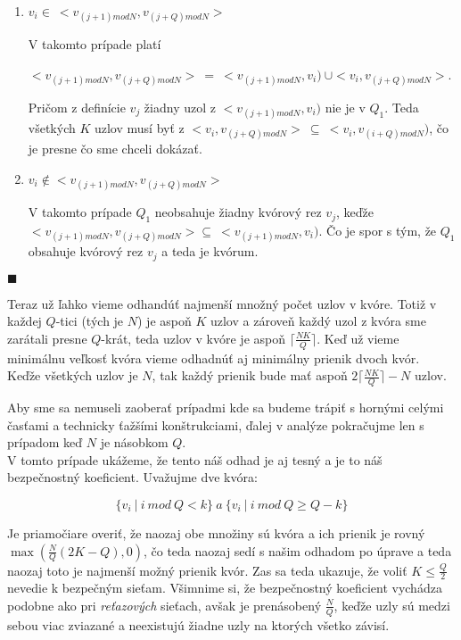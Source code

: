 \begin{enumerate}
  \item $v_i\in\: <v_{(j+1) mod N}, v_{(j+Q) mod N}>$

        V takomto prípade platí

        $<v_{(j+1) mod N}, v_{(j+Q) mod N}>\:=\: <v_{(j+1) mod N}, v_i)\: \cup <v_i, v_{(j+Q) mod N}>$.

        Pričom z definície $v_j$ žiadny uzol z $<v_{(j+1) mod N}, v_i)$ nie je v $Q_1$.
        Teda všetkých $K$ uzlov musí byť z $<v_i, v_{(j+Q) mod N}>\: \subseteq\: <v_i, v_{(i+Q) mod N})$,
        čo je presne čo sme chceli dokázať.
  \item $v_i\notin <v_{(j+1) mod N}, v_{(j+Q) mod N}>$

        V takomto prípade $Q_1$ neobsahuje žiadny kvórový rez $v_j$, keďže\\
        $<v_{(j+1) mod N}, v_{(j+Q) mod N}> \subseteq\: <v_{(j+1) mod N}, v_i)$.
        Čo je spor s tým, že $Q_1$ obsahuje kvórový rez $v_j$ a teda je kvórum.
\end{enumerate} $\blacksquare$

\pagebreak

Teraz už ľahko vieme odhandúť najmenší množný počet uzlov v kvóre.
Totiž v každej $Q$-tici (tých je $N$) je aspoň $K$ uzlov a zároveň každý uzol
z kvóra sme zarátali presne $Q$-krát, teda uzlov v kvóre je aspoň
$\lceil\frac{NK}{Q}\rceil$.
Keď už vieme minimálnu veľkosť kvóra vieme odhadnúť aj minimálny prienik dvoch kvór.
Keďže všetkých uzlov je $N$, tak každý prienik bude mať aspoň
$2\lceil\frac{NK}{Q}\rceil-N$ uzlov.

Aby sme sa nemuseli zaoberať prípadmi kde sa budeme trápiť s hornými celými časťami
a technicky ťažšími konštrukciami, ďalej v analýze pokračujme len s prípadom keď
$N$ je násobkom $Q$.\\
V tomto prípade ukážeme, že tento náš odhad je aj tesný a je to náš bezpečnostný
koeficient.
Uvažujme dve kvóra:

$$\{v_i\ |\ i\ mod\ Q < k\}\ a \ \{v_i\ |\ i\ mod\ Q \geq Q-k\}$$

Je priamočiare overiť, že naozaj obe množiny sú kvóra a ich prienik je rovný\\
$\max(\frac{N}{Q}(2K-Q),0)$, čo teda naozaj sedí s našim odhadom po úprave
a teda naozaj toto je najmenší možný prienik kvór.
Zas sa teda ukazuje, že voliť $K\leq\frac{Q}{2}$ nevedie k bezpečným sieťam.
Všimnime si, že bezpečnostný koeficient vychádza podobne ako pri
\textit{reťazových} sieťach, avšak je prenásobený $\frac{N}{Q}$, keďže uzly
sú medzi sebou viac zviazané a neexistujú žiadne  uzly na ktorých
všetko závisí.

